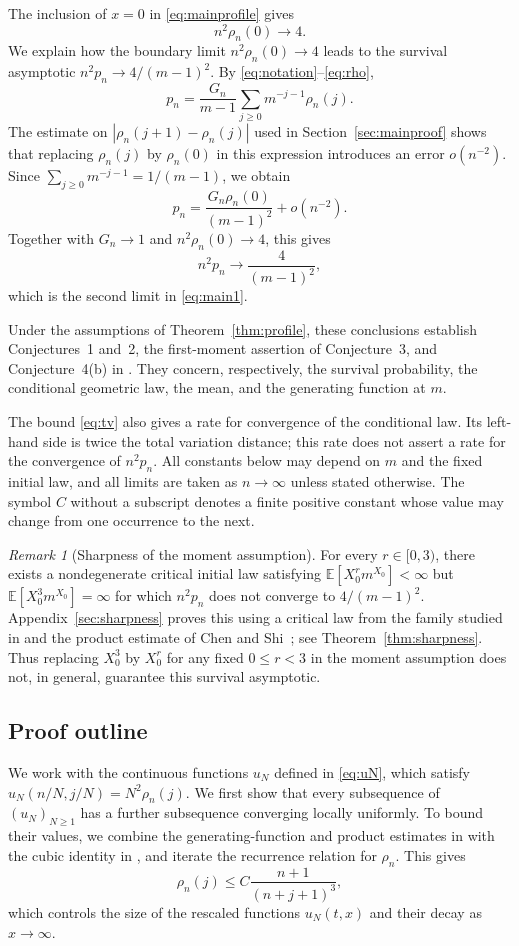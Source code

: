 \documentclass[11pt,letterpaper,reqno]{amsart}
\numberwithin{equation}{section}
\theoremstyle{plain}
\theoremstyle{remark}
\newtheorem*{remark}{Remark}
\newcommand{\E}{\mathbb E}\newcommand{\Pp}{\mathbb P}
\begin{document}
The inclusion of $x=0$ in \eqref{eq:mainprofile} gives
\[
 n^2\rho_n(0)\longrightarrow4.
\]
We explain how the boundary limit $n^2\rho_n(0)\to4$ leads to the survival asymptotic $n^2p_n\to4/(m-1)^2$. By \eqref{eq:notation}--\eqref{eq:rho},
\[
 p_n=\frac{G_n}{m-1}\sum_{j\ge0}m^{-j-1}\rho_n(j).
\]
The estimate on $|\rho_n(j+1)-\rho_n(j)|$ used in Section~\ref{sec:mainproof} shows that replacing $\rho_n(j)$ by $\rho_n(0)$ in this expression introduces an error $o(n^{-2})$. Since $\sum_{j\ge0}m^{-j-1}=1/(m-1)$, we obtain
\[
 p_n=\frac{G_n\rho_n(0)}{(m-1)^2}+o(n^{-2}).
\]
Together with $G_n\to1$ and $n^2\rho_n(0)\to4$, this gives
\[
 n^2p_n\longrightarrow\frac4{(m-1)^2},
\]
which is the second limit in \eqref{eq:main1}.

Under the assumptions of Theorem~\ref{thm:profile}, these conclusions establish Conjectures~1 and~2, the first-moment assertion of Conjecture~3, and Conjecture~4(b) in \cite{CDHLS}. They concern, respectively, the survival probability, the conditional geometric law, the mean, and the generating function at $m$.

The bound \eqref{eq:tv} also gives a rate for convergence of the conditional law. Its left-hand side is twice the total variation distance; this rate does not assert a rate for the convergence of $n^2p_n$. All constants below may depend on $m$ and the fixed initial law, and all limits are taken as $n\to\infty$ unless stated otherwise. The symbol $C$ without a subscript denotes a finite positive constant whose value may change from one occurrence to the next.

\begin{remark}[Sharpness of the moment assumption]
For every $r\in[0,3)$, there exists a nondegenerate critical initial law satisfying $\E[X_0^rm^{X_0}]<\infty$ but $\E[X_0^3m^{X_0}]=\infty$ for which $n^2p_n$ does not converge to $4/(m-1)^2$. Appendix~\ref{sec:sharpness} proves this using a critical law from the family studied in \cite{CDDHLS,CS} and the product estimate of Chen and Shi~\cite[Theorem~1.1]{CS}; see Theorem~\ref{thm:sharpness}. Thus replacing $X_0^3$ by $X_0^r$ for any fixed $0\le r<3$ in the moment assumption does not, in general, guarantee this survival asymptotic.
\end{remark}

\subsection{Proof outline}
We work with the continuous functions $u_N$ defined in \eqref{eq:uN}, which satisfy $u_N(n/N,j/N)=N^2\rho_n(j)$. We first show that every subsequence of $(u_N)_{N\ge1}$ has a further subsequence converging locally uniformly. To bound their values, we combine the generating-function and product estimates in \cite[Theorem~3 and Proposition~1]{CDHLS} with the cubic identity in \cite[eqs.~(18)--(19)]{CDHLS}, and iterate the recurrence relation for $\rho_n$. This gives
\[
 \rho_n(j)\le C\frac{n+1}{(n+j+1)^3},
\]
which controls the size of the rescaled functions $u_N(t,x)$ and their decay as $x\to\infty$.
\end{document}
